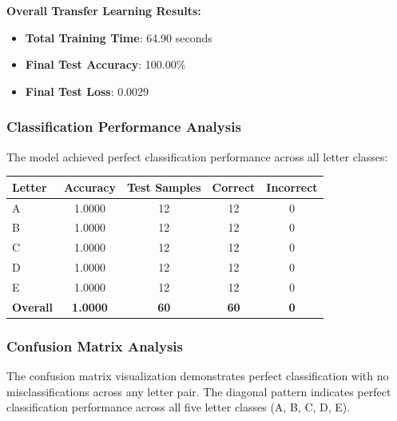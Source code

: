\documentclass[12pt,a4paper]{article}
\begin{document}
\textbf{Overall Transfer Learning Results:}
\begin{itemize}
    \item \textbf{Total Training Time}: 64.90 seconds
    \item \textbf{Final Test Accuracy}: 100.00\%
    \item \textbf{Final Test Loss}: 0.0029
\end{itemize}

\subsubsection{Classification Performance Analysis}

The model achieved perfect classification performance across all letter classes:

\begin{center}
\begin{tabular}{|l|c|c|c|c|}
\hline
\textbf{Letter} & \textbf{Accuracy} & \textbf{Test Samples} & \textbf{Correct} & \textbf{Incorrect} \\
\hline
A & 1.0000 & 12 & 12 & 0 \\
B & 1.0000 & 12 & 12 & 0 \\
C & 1.0000 & 12 & 12 & 0 \\
D & 1.0000 & 12 & 12 & 0 \\
E & 1.0000 & 12 & 12 & 0 \\
\hline
\textbf{Overall} & \textbf{1.0000} & \textbf{60} & \textbf{60} & \textbf{0} \\
\hline
\end{tabular}
\end{center}

\subsubsection{Confusion Matrix Analysis}

The confusion matrix visualization demonstrates perfect classification with no misclassifications across any letter pair. The diagonal pattern indicates perfect classification performance across all five letter classes (A, B, C, D, E).
\end{document}
